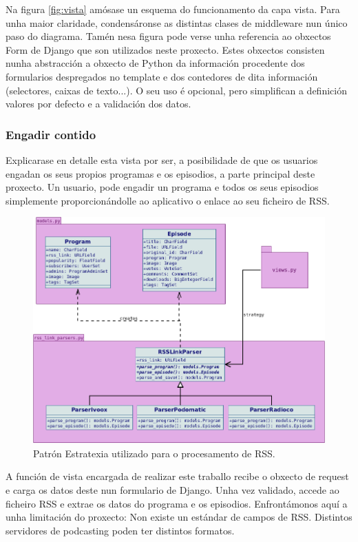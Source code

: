 Na figura \ref{fig:vista} amósase un esquema do funcionamento da capa vista. Para unha maior claridade, condensáronse as distintas clases de middleware nun único paso do diagrama. Tamén nesa figura pode verse unha referencia ao obxectos Form de Django que son utilizados neste proxecto. Estes obxectos consisten nunha abstracción a obxecto de Python da información procedente dos formularios despregados no template e dos contedores de dita información (selectores, caixas de texto...). O seu uso é opcional, pero simplifican a definición valores por defecto e a validación dos datos. 


\subsubsection{Engadir contido}
\label{rss_parser_section}

Explicarase en detalle esta vista por ser, a posibilidade de que os usuarios engadan os seus propios programas e os episodios, a parte principal deste proxecto. Un usuario, pode engadir un programa e todos os seus episodios simplemente proporcionándolle ao aplicativo o enlace ao seu ficheiro de RSS.

\begin{figure}[h]
	\centering
	\includegraphics[scale=0.45,keepaspectratio=true]{./images/strategy.png}
	\caption{Patrón Estratexia utilizado para o procesamento de RSS.}
	\label{fig:strategy}
\end{figure}

A función de vista encargada de realizar este traballo recibe o obxecto de request e carga os datos deste nun formulario de Django. Unha vez validado, accede ao ficheiro RSS e extrae os datos do programa e os episodios. Enfrontámonos aquí a unha limitación do proxecto: Non existe un estándar de campos de RSS. Distintos servidores de podcasting poden ter distintos formatos.

